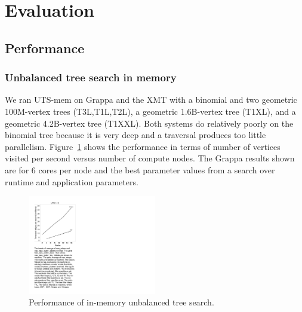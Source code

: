 \section{Evaluation} \label{sec:evaluation}


\subsection{Performance}



\subsubsection{Unbalanced tree search in memory}



We ran UTS-mem on Grappa and the XMT with a binomial and two geometric
100M-vertex trees (T3L,T1L,T2L), a geometric 1.6B-vertex tree (T1XL),
and a geometric 4.2B-vertex tree (T1XXL). Both systems do relatively
poorly on the binomial tree because it is very deep and a traversal
produces too little parallelism. Figure~\ref{fig:uts_compare} shows
the performance in terms of number of vertices visited per second versus
number of compute nodes. The Grappa results shown are for 6 cores per
node and the best parameter values from a search over runtime and
application parameters.



\begin{figure}[ht]
    \begin{center}
      \includegraphics[width=0.5\textwidth]{figs/uts_performance.pdf}
    \end{center}
    \caption{Performance of in-memory unbalanced tree search.}
    \label{fig:uts_compare}
\end{figure}


